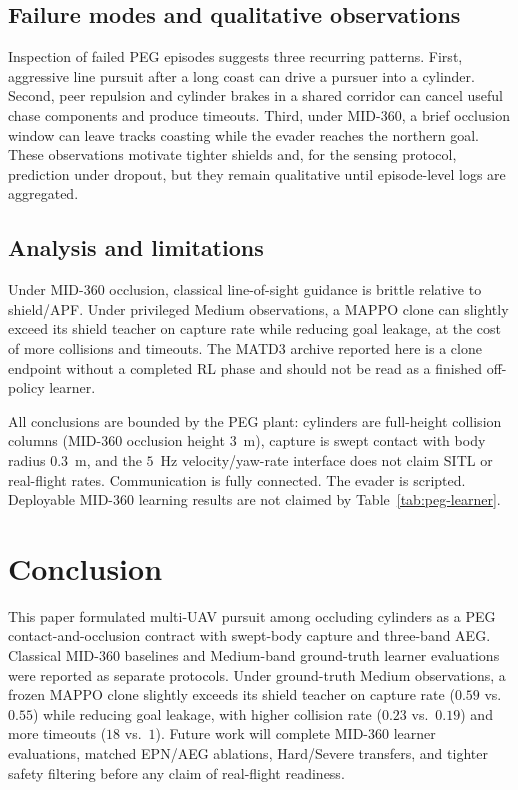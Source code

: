 \documentclass{SCIS2026}
\begin{document}
\subsection{Failure modes and qualitative observations}
Inspection of failed PEG episodes suggests three recurring patterns. First, aggressive line pursuit after a long coast can drive a pursuer into a cylinder. Second, peer repulsion and cylinder brakes in a shared corridor can cancel useful chase components and produce timeouts. Third, under MID-360, a brief occlusion window can leave tracks coasting while the evader reaches the northern goal. These observations motivate tighter shields and, for the sensing protocol, prediction under dropout, but they remain qualitative until episode-level logs are aggregated.

\subsection{Analysis and limitations}
Under MID-360 occlusion, classical line-of-sight guidance is brittle relative to shield/APF. Under privileged Medium observations, a MAPPO clone can slightly exceed its shield teacher on capture rate while reducing goal leakage, at the cost of more collisions and timeouts. The MATD3 archive reported here is a clone endpoint without a completed RL phase and should not be read as a finished off-policy learner.

All conclusions are bounded by the PEG plant: cylinders are full-height collision columns (MID-360 occlusion height $3$~m), capture is swept contact with body radius $0.3$~m, and the $5$~Hz velocity/yaw-rate interface does not claim SITL or real-flight rates. Communication is fully connected. The evader is scripted. Deployable MID-360 learning results are not claimed by Table~\ref{tab:peg-learner}.

\section{Conclusion}
This paper formulated multi-UAV pursuit among occluding cylinders as a PEG contact-and-occlusion contract with swept-body capture and three-band AEG. Classical MID-360 baselines and Medium-band ground-truth learner evaluations were reported as separate protocols. Under ground-truth Medium observations, a frozen MAPPO clone slightly exceeds its shield teacher on capture rate ($0.59$ vs.\ $0.55$) while reducing goal leakage, with higher collision rate ($0.23$ vs.\ $0.19$) and more timeouts ($18$ vs.\ $1$). Future work will complete MID-360 learner evaluations, matched EPN/AEG ablations, Hard/Severe transfers, and tighter safety filtering before any claim of real-flight readiness.
\end{document}
